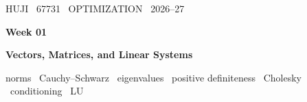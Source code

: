 
\graphicspath{{figures/week01/}}
\renewcommand{\headleft}{67731 \textperiodcentered\ WEEK 01}
\renewcommand{\headright}{OPTIMIZATION}

\newcommand{\R}{\mathbb{R}}
\newcommand{\norm}[1]{\lVert #1\rVert}
\newcommand{\Tr}{\operatorname{Tr}}
\newcommand{\Diag}{\operatorname{Diag}}
\newcommand{\diag}{\operatorname{diag}}
\newcommand{\figcap}[1]{\par\smallskip{\small\color{muted}#1}\par}
\newcommand{\tocpart}[1]{\par\smallskip{\ttfamily\scriptsize\color{pgreen}#1}\par}
\newcommand{\parttitle}[2]{%
  \clearpage
  {\ttfamily\small\color{pgreen}#1}\par\vspace{2pt}
  {\sffamily\bfseries\fontsize{26}{30}\selectfont\color{pgold}#2}\par
  \vspace{4pt}{\color{border}\rule{\linewidth}{1.8pt}}\par\vspace{0.6em}%
  \addtocontents{toc}{\protect\tocpart{#1}}}



{\ttfamily\small\color{pgreen}HUJI \textperiodcentered\ 67731 \textperiodcentered\ OPTIMIZATION \textperiodcentered\ 2026--27}\par\vspace{6pt}
{\sffamily\bfseries\fontsize{30}{34}\selectfont\color{pgold}Week 01}\par\vspace{4pt}
{\sffamily\bfseries\Large\color{pgold}Vectors, Matrices, and Linear Systems}\par\vspace{4pt}
{\ttfamily\small\color{pcyan}norms \textperiodcentered\ Cauchy--Schwarz \textperiodcentered\ eigenvalues \textperiodcentered\ positive definiteness \textperiodcentered\ Cholesky \textperiodcentered\ conditioning \textperiodcentered\ LU}\par
\vspace{0.8em}

